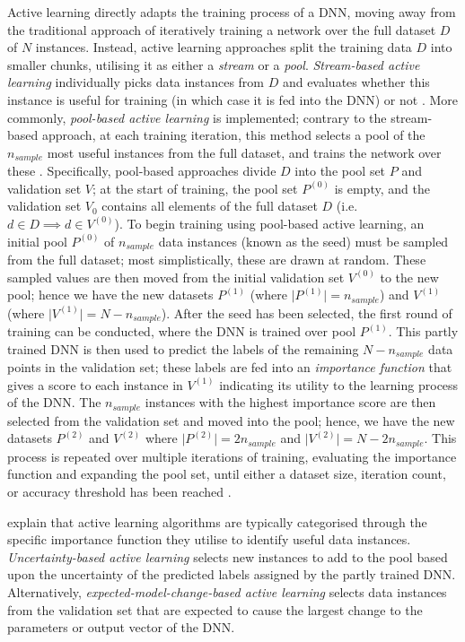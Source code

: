 \documentclass[a4paper, 11pt]{report}
\begin{document}
    Active learning directly adapts the training process of a DNN, moving away from the traditional approach of iteratively training a network over the full dataset $D$ of $N$ instances. Instead, active learning approaches split the training data $D$ into smaller chunks, utilising it as either a \emph{stream} or a \emph{pool}. \emph{Stream-based active learning} individually picks data instances from $D$ and evaluates whether this instance is useful for training (in which case it is fed into the DNN) or not \citep{ren-2021}. More commonly, \emph{pool-based active learning} is implemented; contrary to the stream-based approach, at each training iteration, this method selects a pool of the $n_{sample}$ most useful instances from the full dataset, and trains the network over these \citep{ren-2021}. Specifically, pool-based approaches divide $D$ into the pool set $P$ and validation set $V$; at the start of training, the pool set $P^{(0)}$ is empty, and the validation set $V_0$ contains all elements of the full dataset $D$ (i.e. $d \in D \implies d \in V^{(0)}$). To begin training using pool-based active learning, an initial pool $P^{(0)}$ of $n_{sample}$ data instances (known as the seed) must be sampled from the full dataset; most simplistically, these are drawn at random. These sampled values are then moved from the initial validation set $V^{(0)}$ to the new pool; hence we have the new datasets $P^{(1)}$ (where $\vert P^{(1)} \vert = n_{sample}$) and $V^{(1)}$ (where $\vert V^{(1)} \vert = N - n_{sample}$). After the seed has been selected, the first round of training can be conducted, where the DNN is trained over pool $P^{(1)}$. This partly trained DNN is then used to predict the labels of the remaining $N - n_{sample}$ data points in the validation set; these labels are fed into an \emph{importance function} that gives a score to each instance in $V^{(1)}$ indicating its utility to the learning process of the DNN. The $n_{sample}$ instances with the highest importance score are then selected from the validation set and moved into the pool; hence, we have the new datasets $P^{(2)}$ and $V^{(2)}$ where $\vert P^{(2)} \vert = 2 n_{sample}$ and $\vert V^{(2)} \vert = N - 2 n_{sample}$. This process is repeated over multiple iterations of training, evaluating the importance function and expanding the pool set, until either a dataset size, iteration count, or accuracy threshold has been reached \citep{ren-2021}. 

    \citet{xu-2021} explain that active learning algorithms are typically categorised through the specific importance function they utilise to identify useful data instances. \emph{Uncertainty-based active learning} selects new instances to add to the pool based upon the uncertainty of the predicted labels assigned by the partly trained DNN. Alternatively, \emph{expected-model-change-based active learning} selects data instances from the validation set that are expected to cause the largest change to the parameters or output vector of the DNN. 
\end{document}
